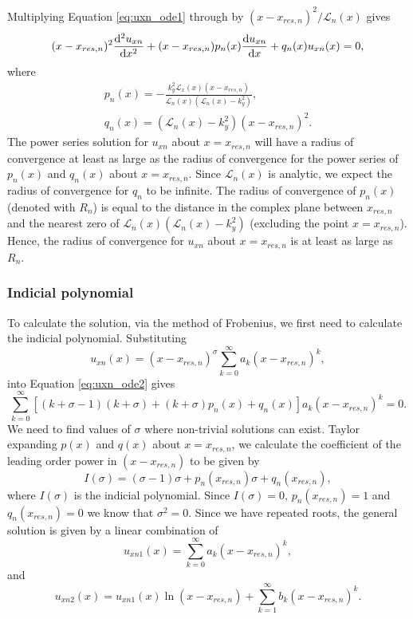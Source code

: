 Multiplying Equation \eqref{eq:uxn_ode1} through by $(x-x_{res,n})^2/\mathcal{L}_n(x)$ gives
\begin{equation}
    \label{eq:uxn_ode2}
    (x-x_{res,n})^2\dv[2]{u_{xn}}{x} + (x-x_{res,n})p_n(x)\dv{u_{xn}}{x} + q_n(x)u_{xn}(x)=0,
\end{equation}
where
\begin{gather}
    p_n(x) = -\frac{k_y^2\mathcal{L}_x(x)(x-x_{res,n})}{\mathcal{L}_n(x)(\mathcal{L}_n(x)-k_y^2)}, \\
    q_n(x) = (\mathcal{L}_n(x)-k_y^2)(x-x_{res,n})^2.
\end{gather}
The power series solution for $u_{xn}$ about $x=x_{res,n}$ will have a radius of convergence at least as large as the radius of convergence for the power series of $p_n(x)$ and $q_n(x)$ about $x=x_{res,n}$. Since $\mathcal{L}_n(x)$ is analytic, we expect the radius of convergence for $q_n$ to be infinite. The radius of convergence of $p_n(x)$ (denoted with $R_n$) is equal to the distance in the complex plane between $x_{res,n}$ and the nearest zero of $\mathcal{L}_n(x)(\mathcal{L}_n(x)-k_y^2)$ (excluding the point $x=x_{res,n}$). Hence, the radius of convergence for $u_{xn}$ about $x=x_{res,n}$ is at least as large as $R_n$.

\subsubsection{Indicial polynomial}

To calculate the solution, via the method of Frobenius, we first need to calculate the indicial polynomial. Substituting
\[u_{xn}(x)=(x-x_{res,n})^\sigma\sum_{k=0}^\infty a_k(x-x_{res,n})^k,\]
into Equation \eqref{eq:uxn_ode2} gives
\[\sum_{k=0}^\infty [(k + \sigma - 1)(k+\sigma) + (k+\sigma)p_n(x) + q_n(x)]a_k(x-x_{res,n})^k=0.\]
We need to find values of $\sigma$ where non-trivial solutions can exist.
Taylor expanding $p(x)$ and $q(x)$ about $x=x_{res,n}$, we calculate the coefficient of the leading order power in $(x-x_{res,n})$ to be given by
\begin{equation}
    I(\sigma) = (\sigma-1)\sigma + p_n(x_{res,n})\sigma + q_n(x_{res,n}),
\end{equation}
where $I(\sigma)$ is the indicial polynomial. Since $I(\sigma)=0$, $p_n(x_{res,n})=1$ and $q_n(x_{res,n})=0$ we know that $\sigma^2=0$. Since we have repeated roots, the general solution  is given by a linear combination of
\begin{equation}
    u_{xn1}(x) = \sum_{k=0}^\infty a_k(x-x_{res,n})^k,
\end{equation}
and
\begin{equation}
    u_{xn2}(x) = u_{xn1}(x)\ln(x-x_{res,n}) + \sum_{k=1}^\infty b_k(x-x_{res,n})^k.
\end{equation}

